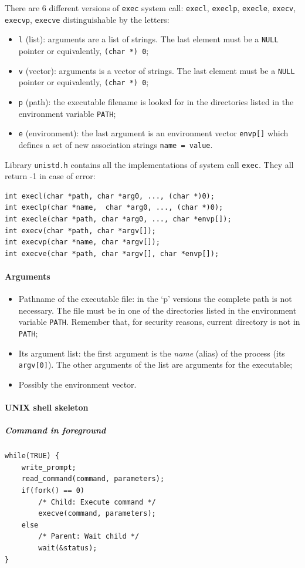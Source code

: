 There are 6 different versions of \texttt{exec} system call: \texttt{execl}, \texttt{execlp}, \texttt{execle}, \texttt{execv}, \texttt{execvp}, \texttt{execve} distinguishable by the letters:
\begin{itemize}
\item \texttt{l} (list): arguments are a list of strings. The last element must be a \texttt{NULL} pointer or equivalently, \texttt{(char *) 0};
\item \texttt{v} (vector): arguments is a vector of strings. The last element must be a \texttt{NULL} pointer or equivalently, \texttt{(char *) 0};
\item \texttt{p} (path): the executable filename is looked for in the directories listed in the environment variable \texttt{PATH};
\item \texttt{e} (environment): the last argument is an environment vector \texttt{envp[]} which defines a set of new association strings \texttt{name = value}.
\end{itemize}

Library \texttt{unistd.h} contains all the implementations of system call \texttt{exec}. They all return -1 in case of error:
\begin{verbatim}
int execl(char *path, char *arg0, ..., (char *)0);
int execlp(char *name,  char *arg0, ..., (char *)0);
int execle(char *path, char *arg0, ..., char *envp[]);
int execv(char *path, char *argv[]);
int execvp(char *name, char *argv[]);
int execve(char *path, char *argv[], char *envp[]);
\end{verbatim}

\paragraph{Arguments}
\begin{itemize}
\item Pathname of the executable file: in the `p' versions the complete path is not necessary. The file must be in one of the directories listed in the environment variable \texttt{PATH}. Remember that, for security reasons, current directory is not in \texttt{PATH};
\item Its argument list: the first argument is the \textit{name} (alias) of the process (its \texttt{argv[0]}). The other arguments of the list are arguments for the executable;
\item Possibly the environment vector.
\end{itemize}

\paragraph{UNIX shell skeleton}
\subparagraph{Command in foreground}
\begin{verbatim}
while(TRUE) {
    write_prompt;
    read_command(command, parameters);
    if(fork() == 0)
        /* Child: Execute command */
        execve(command, parameters);
    else
        /* Parent: Wait child */
        wait(&status);
}
\end{verbatim}

